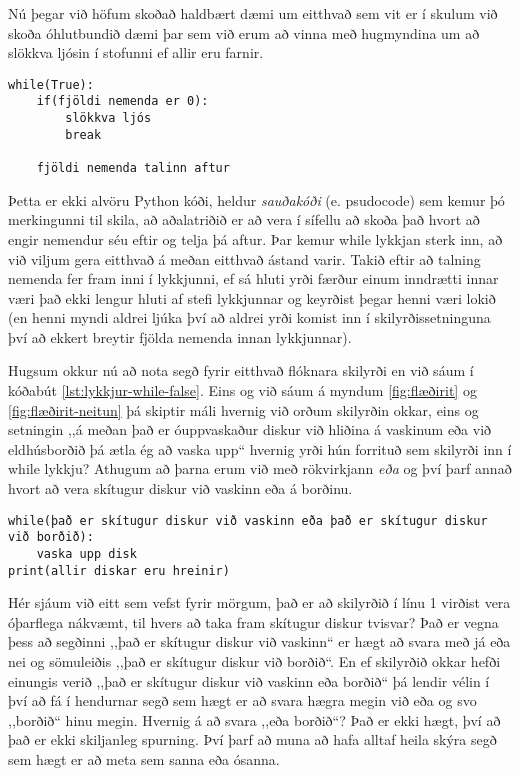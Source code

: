 Nú þegar við höfum skoðað haldbært dæmi um eitthvað sem vit er í skulum við skoða óhlutbundið dæmi þar sem við erum að vinna með hugmyndina um að slökkva ljósin í stofunni ef allir eru farnir.

\begin{lstlisting}
while(True):
	if(fjöldi nemenda er 0):
		slökkva ljós
		break
		
	fjöldi nemenda talinn aftur
\end{lstlisting}
\lstset{style=venjulegt}

Þetta er ekki alvöru Python kóði, heldur \emph{sauðakóði} (e. psudocode) sem kemur þó merkingunni til skila, að aðalatriðið er að vera í sífellu að skoða það hvort að engir nemendur séu eftir og telja þá aftur.
Þar kemur while lykkjan sterk inn, að við viljum gera eitthvað á meðan eitthvað ástand varir.
Takið eftir að talning nemenda fer fram inni í lykkjunni, ef sá hluti yrði færður einum inndrætti innar væri það ekki lengur hluti af stefi lykkjunnar og keyrðist þegar henni væri lokið (en henni myndi aldrei ljúka því að aldrei yrði komist inn í skilyrðissetninguna því að ekkert breytir fjölda nemenda innan lykkjunnar).

Hugsum okkur nú að nota segð fyrir eitthvað flóknara skilyrði en við sáum í kóðabút \ref{lst:lykkjur-while-false}.
Eins og við sáum á myndum \ref{fig:flæðirit} og \ref{fig:flæðirit-neitun} þá skiptir máli hvernig við orðum skilyrðin okkar, eins og setningin ,,á meðan það er óuppvaskaður diskur við hliðina á vaskinum eða við eldhúsborðið þá ætla ég að vaska upp“ hvernig yrði hún forrituð sem skilyrði inn í while lykkju?
Athugum að þarna erum við með rökvirkjann \emph{eða} og því þarf annað hvort að vera skítugur diskur við vaskinn eða á borðinu.
\begin{lstlisting}[caption=while lykkja óhlutbundin til að sýna rökvirkja, label=lst:lykkjur-while-or]
while(það er skítugur diskur við vaskinn eða það er skítugur diskur við borðið):
	vaska upp disk
print(allir diskar eru hreinir)
\end{lstlisting}
\lstset{style=venjulegt}

Hér sjáum við eitt sem vefst fyrir mörgum, það er að skilyrðið í línu 1 virðist vera óþarflega nákvæmt, til hvers að taka fram skítugur diskur tvisvar?
Það er vegna þess að segðinni ,,það er skítugur diskur við vaskinn“ er hægt að svara með já eða nei og sömuleiðis ,,það er skítugur diskur við borðið“.
En ef skilyrðið okkar hefði einungis verið ,,það er skítugur diskur við vaskinn eða borðið“ þá lendir vélin í því að fá í hendurnar segð sem hægt er að svara hægra megin við eða og svo ,,borðið“ hinu megin.
Hvernig á að svara ,,eða borðið“?
Það er ekki hægt, því að það er ekki skiljanleg spurning.
Því þarf að muna að hafa alltaf heila skýra segð sem hægt er að meta sem sanna eða ósanna.

